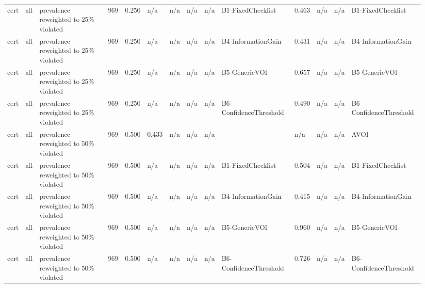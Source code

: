 \begin{table}[!ht]
{\begin{tabular}{llllllllllllll}
cert & all & prevalence reweighted to 25\% violated & 969 & 0.250 & n/a & n/a & n/a & n/a & B1-FixedChecklist & 0.463 & n/a & n/a & B1-FixedChecklist \\
cert & all & prevalence reweighted to 25\% violated & 969 & 0.250 & n/a & n/a & n/a & n/a & B4-InformationGain & 0.431 & n/a & n/a & B4-InformationGain \\
cert & all & prevalence reweighted to 25\% violated & 969 & 0.250 & n/a & n/a & n/a & n/a & B5-GenericVOI & 0.657 & n/a & n/a & B5-GenericVOI \\
cert & all & prevalence reweighted to 25\% violated & 969 & 0.250 & n/a & n/a & n/a & n/a & B6-ConfidenceThreshold & 0.490 & n/a & n/a & B6-ConfidenceThreshold \\
cert & all & prevalence reweighted to 50\% violated & 969 & 0.500 & 0.433 & n/a & n/a & n/a &  & n/a & n/a & n/a & AVOI \\
cert & all & prevalence reweighted to 50\% violated & 969 & 0.500 & n/a & n/a & n/a & n/a & B1-FixedChecklist & 0.504 & n/a & n/a & B1-FixedChecklist \\
cert & all & prevalence reweighted to 50\% violated & 969 & 0.500 & n/a & n/a & n/a & n/a & B4-InformationGain & 0.415 & n/a & n/a & B4-InformationGain \\
cert & all & prevalence reweighted to 50\% violated & 969 & 0.500 & n/a & n/a & n/a & n/a & B5-GenericVOI & 0.960 & n/a & n/a & B5-GenericVOI \\
cert & all & prevalence reweighted to 50\% violated & 969 & 0.500 & n/a & n/a & n/a & n/a & B6-ConfidenceThreshold & 0.726 & n/a & n/a & B6-ConfidenceThreshold \\
\bottomrule
\end{tabular}}
\end{table}

